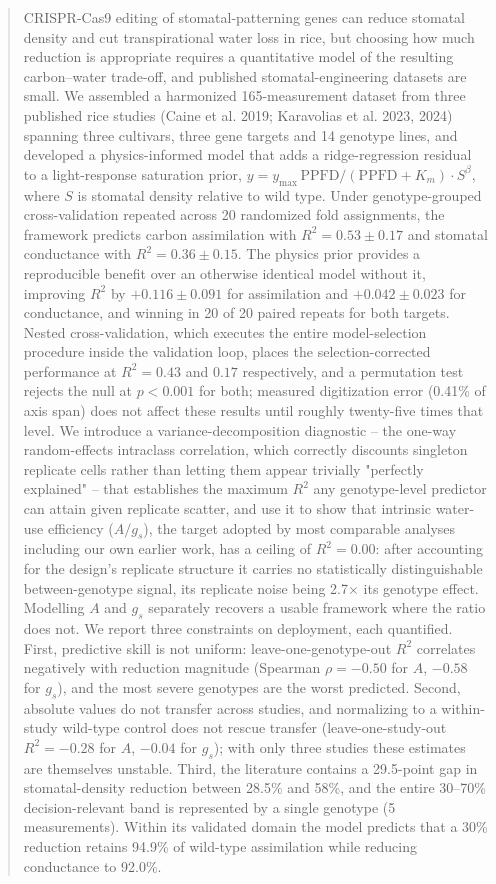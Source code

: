\documentclass[runningheads]{llncs}
\begin{document}
\begin{abstract}
CRISPR-Cas9 editing of stomatal-patterning genes can reduce stomatal density and cut transpirational water loss in rice, but choosing how much reduction is appropriate requires a quantitative model of the resulting carbon--water trade-off, and published stomatal-engineering datasets are small. We assembled a harmonized 165-measurement dataset from three published rice studies (Caine et al. 2019; Karavolias et al. 2023, 2024) spanning three cultivars, three gene targets and 14 genotype lines, and developed a physics-informed model that adds a ridge-regression residual to a light-response saturation prior, $y = y_{\max}\,\mathrm{PPFD}/(\mathrm{PPFD}+K_m)\cdot S^{\beta}$, where $S$ is stomatal density relative to wild type. Under genotype-grouped cross-validation repeated across 20 randomized fold assignments, the framework predicts carbon assimilation with $R^{2}=0.53\pm0.17$ and stomatal conductance with $R^{2}=0.36\pm0.15$. The physics prior provides a reproducible benefit over an otherwise identical model without it, improving $R^{2}$ by $+0.116\pm0.091$ for assimilation and $+0.042\pm0.023$ for conductance, and winning in 20 of 20 paired repeats for both targets. Nested cross-validation, which executes the entire model-selection procedure inside the validation loop, places the selection-corrected performance at $R^{2}=0.43$ and $0.17$ respectively, and a permutation test rejects the null at $p<0.001$ for both; measured digitization error (0.41\% of axis span) does not affect these results until roughly twenty-five times that level. We introduce a variance-decomposition diagnostic -- the one-way random-effects intraclass correlation, which correctly discounts singleton replicate cells rather than letting them appear trivially "perfectly explained" -- that establishes the maximum $R^{2}$ any genotype-level predictor can attain given replicate scatter, and use it to show that intrinsic water-use efficiency ($A/g_s$), the target adopted by most comparable analyses including our own earlier work, has a ceiling of $R^{2}=0.00$: after accounting for the design's replicate structure it carries no statistically distinguishable between-genotype signal, its replicate noise being 2.7$\times$ its genotype effect. Modelling $A$ and $g_s$ separately recovers a usable framework where the ratio does not. We report three constraints on deployment, each quantified. First, predictive skill is not uniform: leave-one-genotype-out $R^{2}$ correlates negatively with reduction magnitude (Spearman $\rho=-0.50$ for $A$, $-0.58$ for $g_s$), and the most severe genotypes are the worst predicted. Second, absolute values do not transfer across studies, and normalizing to a within-study wild-type control does not rescue transfer (leave-one-study-out $R^{2}=-0.28$ for $A$, $-0.04$ for $g_s$); with only three studies these estimates are themselves unstable. Third, the literature contains a 29.5-point gap in stomatal-density reduction between 28.5\% and 58\%, and the entire 30--70\% decision-relevant band is represented by a single genotype (5 measurements). Within its validated domain the model predicts that a 30\% reduction retains 94.9\% of wild-type assimilation while reducing conductance to 92.0\%.


\end{abstract}
\end{document}
